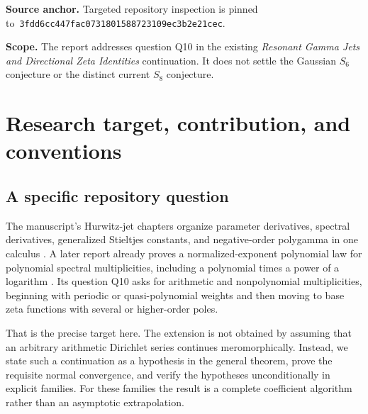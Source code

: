 \documentclass[11pt]{article}
\numberwithin{equation}{section}
\theoremstyle{definition}\newtheorem{definition}[theorem]{Definition}
\theoremstyle{remark}\newtheorem{remark}[theorem]{Remark}\newtheorem{example}[theorem]{Example}
\newcommand{\pin}{\texttt{3fdd6cc447fac0731801588723109ec3b2e21cec}}
\begin{document}
\begin{titlepage}
\begin{abstract}
All theorem statements have ordinary analytic or algebraic proofs. Exact finite
regression tests and independent high-precision diagnostics are supplied separately.
The first multiplicative anomaly and the classical special-function ingredients retain
their attribution. No claim of worldwide priority, arithmetic independence, or
proof-assistant formalization is made.
\end{abstract}
\vfill
\begin{minipage}{.94\textwidth}\small\raggedright
\textbf{Source anchor.} Targeted repository inspection is pinned to\
\pin.\par
\textbf{Scope.} The report addresses question Q10 in the existing
\emph{Resonant Gamma Jets and Directional Zeta Identities} continuation. It does not settle the Gaussian
$S_6$ conjecture or the distinct current $S_8$ conjecture.
\end{minipage}
\end{titlepage}
\begingroup
\small
\setlength{\parskip}{0pt}
\tableofcontents
\endgroup
\clearpage

\section{Research target, contribution, and conventions}
\label{asj:sec:scope}

\subsection{A specific repository question}
The manuscript's Hurwitz-jet chapters organize parameter derivatives, spectral
derivatives, generalized Stieltjes constants, and negative-order polygamma in one
calculus \cite{repo}. A later report already proves a normalized-exponent polynomial
law for polynomial spectral multiplicities, including a polynomial times a power of
a logarithm \cite{prior}. Its question Q10 asks for arithmetic and nonpolynomial
multiplicities, beginning with periodic or quasi-polynomial weights and then moving
to base zeta functions with several or higher-order poles.

That is the precise target here. The extension is not obtained by assuming that an
arbitrary arithmetic Dirichlet series continues meromorphically. Instead, we state
such a continuation as a hypothesis in the general theorem, prove the requisite
normal convergence, and verify the hypotheses unconditionally in explicit families.
For these families the result is a complete coefficient algorithm rather than an
asymptotic extrapolation.
\end{document}
